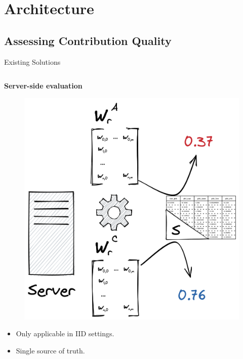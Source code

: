 \section{Architecture}

\subsection{Assessing Contribution Quality}

\begin{frame}
  \subsectionpage
\end{frame}

\begin{frame}{Existing Solutions}

  \begin{columns}[T]
    
    \begin{column}{.33\textwidth}
      \small\centering
      \textbf{Server-side evaluation}~\autocite{zhou_DifferentiallyPrivateFederated_2022}

      \begin{figure}
        \centering
        \includegraphics[height=.36\textheight]{figures/radar/server-side-eval}
      \end{figure}

      \begin{itemize}\smaller
        \item Only applicable in IID settings.
        \item Single source of truth.
      \end{itemize}
    \end{column}


\end{columns}
\end{frame}
